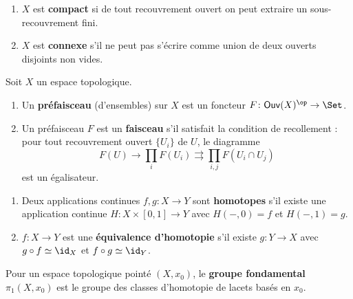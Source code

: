 \begin{definition}\label{def:rappel-compact-connexe}
\begin{enumerate}[label=(\roman*)]
\item $X$ est \textbf{compact} si de tout recouvrement ouvert on peut
      extraire un sous-recouvrement fini.
\item $X$ est \textbf{connexe} s'il ne peut pas s'écrire comme
      union de deux ouverts disjoints non vides.
\end{enumerate}
\end{definition}

\begin{definition}
\label{def:rappel-faisceau}
Soit $X$ un espace topologique.
\begin{enumerate}[label=(\roman*)]
\item Un \textbf{préfaisceau} (d'ensembles) sur $X$ est un foncteur
      $F \colon \mathsf{Ouv}(X)^\op \to \Set$.
\item Un préfaisceau $F$ est un \textbf{faisceau} s'il satisfait la
      condition de recollement : pour tout recouvrement ouvert
      $\{U_i\}$ de $U$, le diagramme
      \[
        F(U) \to \prod_i F(U_i) \rightrightarrows
        \prod_{i,j} F(U_i \cap U_j)
      \]
      est un égalisateur.
\end{enumerate}
\end{definition}

\begin{definition}
\label{def:rappel-homotopie}
\begin{enumerate}[label=(\roman*)]
\item Deux applications continues $f, g \colon X \to Y$ sont
      \textbf{homotopes} s'il existe une application continue
      $H \colon X \times [0,1] \to Y$ avec $H(-, 0) = f$ et
      $H(-, 1) = g$.
\item $f \colon X \to Y$ est une \textbf{équivalence d'homotopie}
      s'il existe $g \colon Y \to X$ avec $g \circ f \simeq \id_X$
      et $f \circ g \simeq \id_Y$.
\end{enumerate}
\end{definition}

\begin{definition}\label{def:rappel-pi1}
Pour un espace topologique pointé $(X, x_0)$, le \textbf{groupe
fondamental} $\pi_1(X, x_0)$ est le groupe des classes d'homotopie
de lacets basés en $x_0$.
\end{definition}



\printindex


